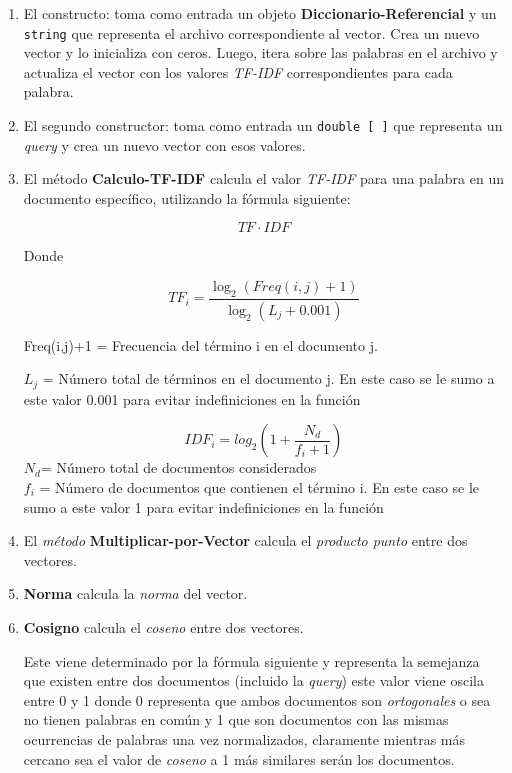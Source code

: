\documentclass[a4paper,12pt]{article}
\begin{document}
\begin{enumerate}

\item El constructo: toma como entrada un objeto \textbf{Diccionario-Referencial} y un \texttt{string} que representa el archivo correspondiente al vector. Crea un nuevo vector y lo inicializa con ceros. Luego, itera sobre las palabras en el archivo y actualiza el vector con los valores \textit{TF-IDF} correspondientes para cada palabra.
\item El segundo constructor: toma como entrada un \texttt{double [ ]} que representa un \textit{query} y crea un nuevo vector con esos valores.
\item El método \textbf{Calculo-TF-IDF} calcula el valor \textit{TF-IDF} para una palabra en un documento específico, utilizando la fórmula siguiente:

\begin{equation}\label{eq:TF*IDF}
TF\cdot IDF
\end{equation}

Donde 

\begin{equation}\label{eq:TF}
TF_{i}=\frac{\log_{2}(Freq(i,j)+1)}{\log_{2}(L_{j}+0.001)}
\end{equation}

Freq(i,j)+1 = Frecuencia del término i en el documento j.

$L_{j}$ = Número total de términos en el documento j. En este caso se le sumo a este valor 0.001 para evitar indefiniciones en la función 

\begin{equation}\label{eq:IDF}
IDF_{i} = log_{2}(1+\frac{N_{d}}{f_{i}+1})
\end{equation}
$N_{d}$= Número total de documentos considerados\\
$f_{i}$ = Número de documentos que contienen el término i. En este caso se le sumo a este valor 1 para evitar indefiniciones en la función 

\item El \textit{método} \textbf{Multiplicar-por-Vector} calcula el \textit{producto punto} entre dos vectores.
\item \textbf{Norma} calcula la \textit{norma} del vector.
\item \textbf{Cosigno} calcula el \textit{coseno} entre dos vectores.

Este viene determinado por la fórmula siguiente y representa la semejanza que existen entre dos documentos (incluido la \textit{query}) este valor viene oscila entre 0 y 1 donde 0 representa que ambos documentos son \textit{ortogonales} o sea no tienen palabras en común y 1 que son documentos con las mismas ocurrencias de palabras una vez normalizados, claramente mientras más cercano sea el valor de \textit{coseno} a 1 más similares serán los documentos.   


\end{enumerate}
\end{document}
